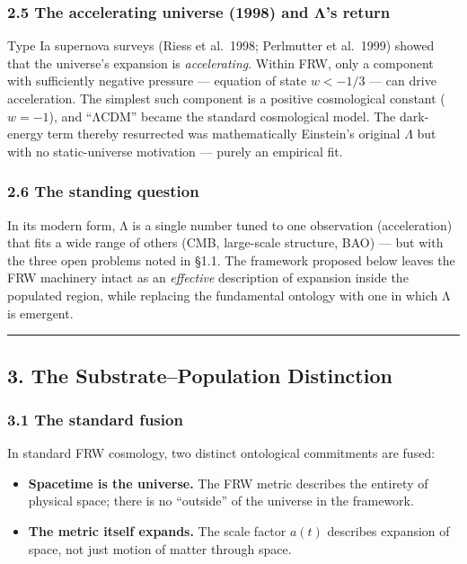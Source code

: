 \documentclass[
]{article}
\providecommand{\tightlist}{%
  \setlength{\itemsep}{0pt}\setlength{\parskip}{0pt}}
\begin{document}
\subsubsection{2.5 The accelerating universe (1998) and Λ's
return}\label{the-accelerating-universe-1998-and-ux3bbs-return}

Type Ia supernova surveys (Riess et al.~1998; Perlmutter et al.~1999)
showed that the universe's expansion is \emph{accelerating}. Within FRW,
only a component with sufficiently negative pressure --- equation of
state \(w < -1/3\) --- can drive acceleration. The simplest such
component is a positive cosmological constant (\(w = -1\)), and ``ΛCDM''
became the standard cosmological model. The dark-energy term thereby
resurrected was mathematically Einstein's original \(\Lambda\) but with
no static-universe motivation --- purely an empirical fit.

\subsubsection{2.6 The standing question}\label{the-standing-question}

In its modern form, Λ is a single number tuned to one observation
(acceleration) that fits a wide range of others (CMB, large-scale
structure, BAO) --- but with the three open problems noted in §1.1. The
framework proposed below leaves the FRW machinery intact as an
\emph{effective} description of expansion inside the populated region,
while replacing the fundamental ontology with one in which Λ is
emergent.

\begin{center}\rule{0.5\linewidth}{0.5pt}\end{center}

\subsection{3. The Substrate--Population
Distinction}\label{the-substratepopulation-distinction}

\subsubsection{3.1 The standard fusion}\label{the-standard-fusion}

In standard FRW cosmology, two distinct ontological commitments are
fused:

\begin{itemize}
\tightlist
\item
  \textbf{Spacetime is the universe.} The FRW metric describes the
  entirety of physical space; there is no ``outside'' of the universe in
  the framework.
\item
  \textbf{The metric itself expands.} The scale factor \(a(t)\)
  describes expansion of space, not just motion of matter through space.
\end{itemize}
\end{document}
